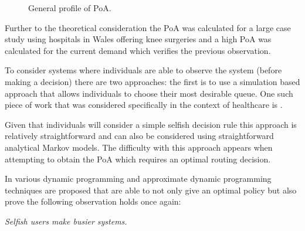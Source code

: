 \documentclass[a4paper,11pt]{article}
\begin{document}
\begin{figure}[!hbtp]
\begin{center}

\end{center}
\caption{General profile of PoA.}\label{fig:poaprofile}
\end{figure}

Further to the theoretical consideration the PoA was calculated for a large case study using hospitals in Wales offering knee surgeries and a high PoA was calculated for the current demand which verifies the previous observation.

To consider systems where individuals are able to observe the system (before making a decision) there are two approaches: the first is to use a simulation based approach that allows individuals to choose their most desirable queue.
One such piece of work that was considered specifically in the context of healthcare is \cite{Knight2010}.

Given that individuals will consider a simple selfish decision rule this approach is relatively straightforward and can also be considered using straightforward analytical Markov models.
The difficulty with this approach appears when attempting to obtain the PoA which requires an optimal routing decision.

In \cite{Shone2014} various dynamic programming and approximate dynamic programming techniques are proposed that are able to not only give an optimal policy but also prove the following observation holds once again:

\begin{center}
\textit{Selfish users make busier systems.}
\end{center}
\end{document}
